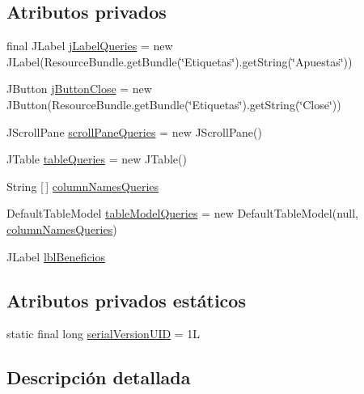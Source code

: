 \subsection*{Atributos privados}
\begin{DoxyCompactItemize}
\item 
final J\+Label \mbox{\hyperlink{classgui_1_1BalanceGUI_a956dfe547a0eefc511a0c8de0a528bda}{j\+Label\+Queries}} = new J\+Label(Resource\+Bundle.\+get\+Bundle(\char`\"{}Etiquetas\char`\"{}).get\+String(\char`\"{}Apuestas\char`\"{}))
\item 
J\+Button \mbox{\hyperlink{classgui_1_1BalanceGUI_a70e391817059e3df5063ce0fbb81bea7}{j\+Button\+Close}} = new J\+Button(Resource\+Bundle.\+get\+Bundle(\char`\"{}Etiquetas\char`\"{}).get\+String(\char`\"{}Close\char`\"{}))
\item 
J\+Scroll\+Pane \mbox{\hyperlink{classgui_1_1BalanceGUI_aa87ad052970f55e24e0c1371fa4c2d12}{scroll\+Pane\+Queries}} = new J\+Scroll\+Pane()
\item 
J\+Table \mbox{\hyperlink{classgui_1_1BalanceGUI_a5db44888868172a54138bd769a6df424}{table\+Queries}} = new J\+Table()
\item 
String \mbox{[}$\,$\mbox{]} \mbox{\hyperlink{classgui_1_1BalanceGUI_ab4164b2af93e9d39e36115108b207159}{column\+Names\+Queries}}
\item 
Default\+Table\+Model \mbox{\hyperlink{classgui_1_1BalanceGUI_a8d9ff8acd0452117f992f344e5da8ee7}{table\+Model\+Queries}} = new Default\+Table\+Model(null, \mbox{\hyperlink{classgui_1_1BalanceGUI_ab4164b2af93e9d39e36115108b207159}{column\+Names\+Queries}})
\item 
J\+Label \mbox{\hyperlink{classgui_1_1BalanceGUI_abc9c078eacbdf6bfd4538b6a855ab906}{lbl\+Beneficios}}
\end{DoxyCompactItemize}
\subsection*{Atributos privados estáticos}
\begin{DoxyCompactItemize}
\item 
static final long \mbox{\hyperlink{classgui_1_1BalanceGUI_a49301c8e84dee6e9ef6205a2df4a2482}{serial\+Version\+U\+ID}} = 1L
\end{DoxyCompactItemize}


\subsection{Descripción detallada}



